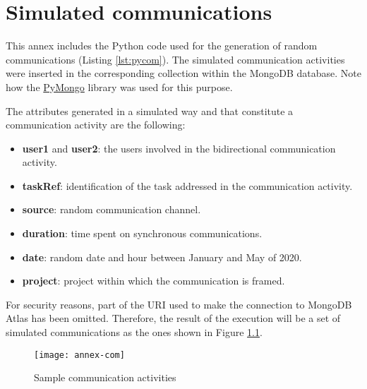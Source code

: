 \chapter{Simulated communications}
\label{cap:annexA}

This annex includes the Python code used for the generation of random communications (Listing \ref{lst:pycom}). The simulated communication activities were inserted in the corresponding collection within the MongoDB database. Note how the \href{https://api.mongodb.com/python/current/tutorial.html}{PyMongo} library was used for this purpose.

The attributes generated in a simulated way and that constitute a communication activity are the following:

\begin{itemize}
\item \textbf{user1} and \textbf{user2}: the users involved in the bidirectional communication activity.
\item \textbf{taskRef}: identification of the task addressed in the communication activity.
\item \textbf{source}: random communication channel.
\item \textbf{duration}: time spent on synchronous communications.
\item \textbf{date}: random date and hour between January and May of 2020.
\item \textbf{project}: project within which the communication is framed.
\end{itemize}

For security reasons, part of the URI used to make the connection to MongoDB Atlas has been omitted. Therefore, the result of the execution will be a set of simulated communications as the ones shown in Figure \ref{fig:coms}.

\newpage


\begin{figure}
	\centering
	\texttt{[image: annex-com]}
	\caption[Sample communication activities]{Sample communication activities}
	\label{fig:coms}
\end{figure}

